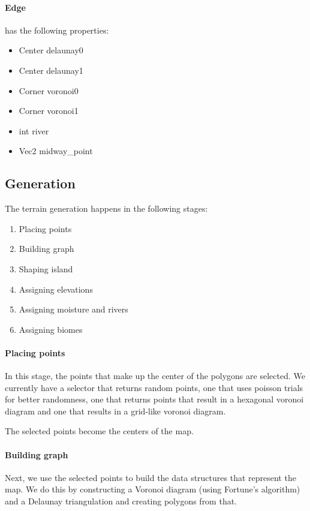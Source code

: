 \paragraph{Edge} has the following properties:

\begin{itemize}
	\item Center delaunay0
	\item Center delaunay1
	\item Corner voronoi0
	\item Corner voronoi1
	\item int river
	\item Vec2 midway\_point
\end{itemize}

\subsection{Generation}

The terrain generation happens in the following stages:

\begin{enumerate}
	\item Placing points
	\item Building graph
	\item Shaping island
	\item Assigning elevations
	\item Assigning moisture and rivers
	\item Assigning biomes
\end{enumerate}

\paragraph{Placing points}

In this stage, the points that make up the center of the polygons are selected.
We currently have a selector that returns random points, one that uses poisson trials for better randomness, one that returns points that result in a hexagonal voronoi diagram and one that results in a grid-like voronoi diagram.

The selected points become the centers of the map.

\paragraph{Building graph}

Next, we use the selected points to build the data structures that represent the map.
We do this by constructing a Voronoi diagram (using Fortune's algorithm) and a Delaunay triangulation and creating polygons from that.


